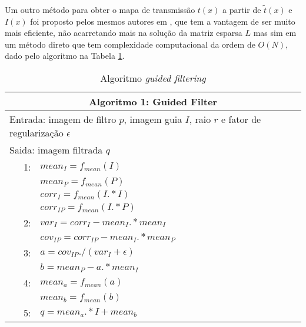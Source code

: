 \documentclass[12pt,openany, oneside,
 article, 
 a4paper, hyphens, english, brazil]{abntex2}
\begin{document}
Um outro método para obter o mapa de transmissão $t(x)$ a partir de $\tilde{t}(x)$ e $I(x)$ foi proposto pelos mesmos autores em \cite{guided_filtering}, que tem a vantagem de ser muito mais eficiente, não acarretando mais na solução da matriz esparsa $L$ mas sim em um método direto que tem complexidade computacional da ordem de $O(N)$, dado pelo algoritmo na Tabela \ref{tabela:guided}.

\begin{table}
	\caption{Algoritmo \textit{guided filtering}}\label{tabela:guided}
\begin{tabularx}{\textwidth}{rl}
\toprule
\multicolumn{2}{c}{Algoritmo 1: Guided Filter}\\
\midrule
\multicolumn{2}{l}{Entrada: imagem de filtro $p$, imagem guia $I$, raio $r$ e fator de regularização $\epsilon$}\\
\multicolumn{2}{l}{Saida: imagem filtrada $q$}\\
\midrule
1: & $mean_I = f_{mean}(I)$\\
& $mean_P = f_{mean}(P)$\\
& $corr_I = f_{mean}(I.*I)$\\
& $corr_{IP} = f_{mean}(I.*P)$\\
2: & $var_I = corr_I - mean_I .* mean_I$\\
& $cov_{IP} = corr_{IP} - mean_I .* mean_P$\\
3: & $a = cov_{IP} ./ (var_I + \epsilon)$\\
& $b = mean_P - a .* mean_I$\\
4: & $mean_a = f_{mean}(a)$ \\
& $mean_b = f_{mean}(b)$ \\
5: & $q = mean_a .* I + mean_b$ \\
\bottomrule
\end{tabularx}
\end{table}
\clearpage
\end{document}
